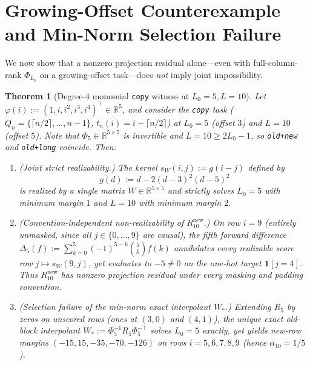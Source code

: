 \documentclass[11pt]{article}
\theoremstyle{plain}
\newtheorem{theorem}{Theorem}
\theoremstyle{definition}
\theoremstyle{remark}
\begin{document}
\section{Growing-Offset Counterexample and Min-Norm Selection Failure}

We now show that a nonzero projection residual alone---even with full-column-rank $\Phi_{L_0}$ on a growing-offset task---does \emph{not} imply joint impossibility.

\begin{theorem}[Degree-$4$ monomial \texttt{copy} witness at $L_0 = 5, L = 10$]\label{thm:copy}
Let $\varphi(i) := (1, i, i^2, i^3, i^4)^\top \in \mathbb{R}^5$, and consider the \texttt{copy} task ($Q_n = \{\lceil n/2 \rceil, \dots, n - 1\}$, $t_n(i) = i - \lceil n/2 \rceil$) at $L_0 = 5$ (offset $3$) and $L = 10$ (offset $5$). Note that $\Phi_5 \in \mathbb{R}^{5 \times 5}$ is invertible and $L = 10 \ge 2L_0 - 1$, so \texttt{old+new} and \texttt{old+long} coincide. Then:
\begin{enumerate}[label=\textup{(\arabic*)},itemsep=2pt]
\item \emph{(Joint strict realizability.)} The kernel $s_W(i, j) := g(i - j)$ defined by
\[
g(d) := d - 2(d - 3)^2(d - 5)^2
\]
is realized by a single matrix $W \in \mathbb{R}^{5 \times 5}$ and strictly solves $L_0 = 5$ with minimum margin $1$ and $L = 10$ with minimum margin $2$.
\item \emph{(Convention-independent non-realizability of $R_{10}^{\mathrm{new}}$.)} On row $i = 9$ (entirely unmasked, since all $j \in \{0, \dots, 9\}$ are causal), the fifth forward difference $\Delta_5(f) := \sum_{k=0}^5 (-1)^{5-k}\binom{5}{k} f(k)$ annihilates every realizable score row $j \mapsto s_W(9, j)$, yet evaluates to $-5 \neq 0$ on the one-hot target $\mathbf{1}[j = 4]$. Thus $R_{10}^{\mathrm{new}}$ has nonzero projection residual under every masking and padding convention.
\item \emph{(Selection failure of the min-norm exact interpolant $W_*$.)} Extending $R_5$ by zeros on unscored rows (ones at $(3, 0)$ and $(4, 1)$), the unique exact old-block interpolant $W_* := \Phi_5^{-1} R_5 \Phi_5^{-\top}$ solves $L_0 = 5$ exactly, yet yields new-row margins $(-15, 15, -35, -70, -126)$ on rows $i = 5, 6, 7, 8, 9$ (hence $\alpha_{10} = 1/5$).
\end{enumerate}
\end{theorem}
\end{document}
